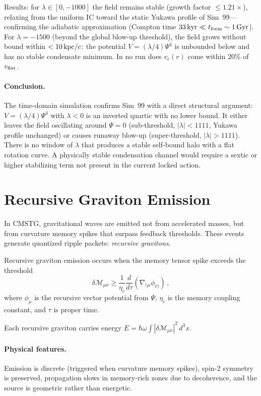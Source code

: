 \documentclass[12pt,a4paper]{article}
\begin{document}
Results: for $\lambda\in[0,-1000]$ the field remains stable (growth
factor $\leq 1.21\times$), relaxing from the uniform IC toward the static
Yukawa profile of Sim~99---confirming the adiabatic approximation
(Compton time $33\,{\rm kyr} \ll t_{\rm form}\sim1\,{\rm Gyr}$).  For
$\lambda=-1500$ (beyond the global blow-up threshold), the field grows
without bound within $< 10\,{\rm kpc}/c$: the potential $V=(\lambda/4)\Psi^4$
is unbounded below and has no stable condensate minimum.  In no run does
$v_c(r)$ come within 20\% of $v_{\rm flat}$.

\paragraph{Conclusion.}
The time-domain simulation confirms Sim~99 with a direct structural
argument: $V=(\lambda/4)\Psi^4$ with $\lambda<0$ is an inverted quartic
with no lower bound.  It either leaves the field oscillating around
$\Psi=0$ (sub-threshold, $|\lambda|<1111$, Yukawa profile unchanged) or
causes runaway blow-up (super-threshold, $|\lambda|>1111$).  There is no
window of $\lambda$ that produces a stable self-bound halo with a flat
rotation curve.  A physically stable condensation channel would require a
sextic or higher stabilizing term not present in the current locked action.

\section{Recursive Graviton Emission}
\label{sec:graviton}

In CMSTG, gravitational waves are emitted not from accelerated masses, but from
curvature memory spikes that surpass feedback thresholds. These events generate
quantized ripple packets: \emph{recursive gravitons}.

Recursive graviton emission occurs when the memory tensor spike exceeds the threshold
\begin{equation}
\delta\mathcal{M}_{\mu\nu} \geq \frac{1}{\eta_c}\frac{d}{d\tau}(\nabla_{(\mu}\phi_{\nu)})\,,
\end{equation}
where $\phi_\mu$ is the recursive vector potential from $\Psi$, $\eta_c$ is the memory
coupling constant, and $\tau$ is proper time.

Each recursive graviton carries energy
$E = \hbar\omega \int |\delta\mathcal{M}_{\mu\nu}|^2\,d^3x$.

\paragraph{Physical features.}
Emission is discrete (triggered when curvature memory spikes),
spin-2 symmetry is preserved, propagation slows in memory-rich zones due to decoherence,
and the source is geometric rather than energetic.
\end{document}
